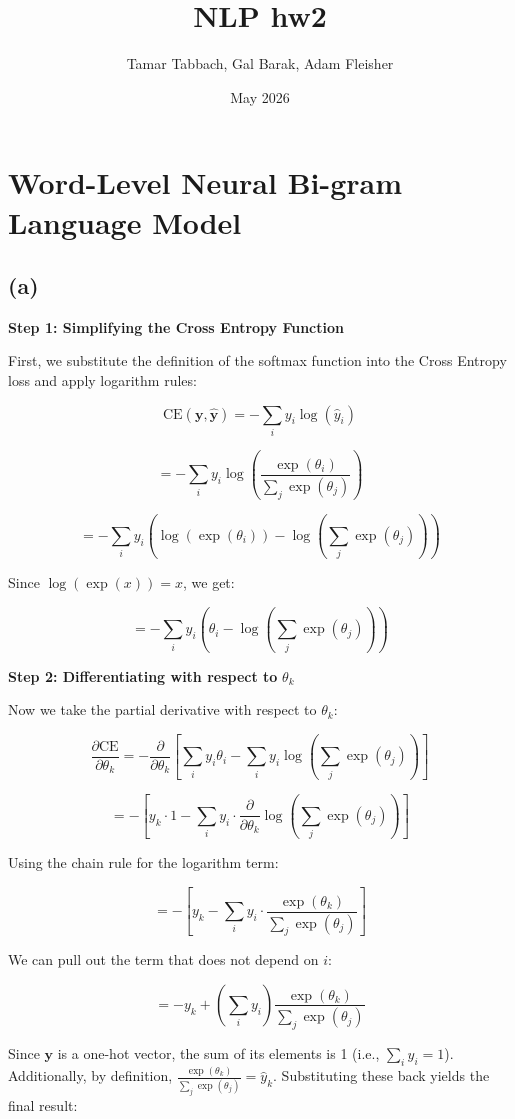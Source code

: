 \documentclass{article}
\title{NLP hw2}
\author{Tamar Tabbach, Gal Barak, Adam Fleisher}
\date{May 2026}
\begin{document}
\maketitle

\section{Word-Level Neural Bi-gram Language Model}

\subsection*{(a)}
\textbf{Step 1: Simplifying the Cross Entropy Function}

First, we substitute the definition of the softmax function into the Cross Entropy loss and apply logarithm rules:

$$\text{CE}(\mathbf{y}, \hat{\mathbf{y}}) = -\sum_i y_i \log(\hat{y}_i)$$

$$= -\sum_i y_i \log\left( \frac{\exp(\theta_i)}{\sum_j \exp(\theta_j)} \right)$$

$$= -\sum_i y_i \left( \log(\exp(\theta_i)) - \log\left(\sum_j \exp(\theta_j)\right) \right)$$

Since $\log(\exp(x)) = x$, we get:

$$= -\sum_i y_i \left( \theta_i - \log\left(\sum_j \exp(\theta_j)\right) \right)$$

\vspace{1em}
\textbf{Step 2: Differentiating with respect to } $\theta_k$

Now we take the partial derivative with respect to $\theta_k$:

$$\frac{\partial \text{CE}}{\partial \theta_k} = -\frac{\partial}{\partial \theta_k} \left[ \sum_i y_i \theta_i - \sum_i y_i \log\left(\sum_j \exp(\theta_j)\right) \right]$$

$$= -\left[ y_k \cdot 1 - \sum_i y_i \cdot \frac{\partial}{\partial \theta_k} \log\left(\sum_j \exp(\theta_j)\right) \right]$$

Using the chain rule for the logarithm term:

$$= -\left[ y_k - \sum_i y_i \cdot \frac{\exp(\theta_k)}{\sum_j \exp(\theta_j)} \right]$$

We can pull out the term that does not depend on $i$:

$$= -y_k + \left( \sum_i y_i \right) \frac{\exp(\theta_k)}{\sum_j \exp(\theta_j)}$$

Since $\mathbf{y}$ is a one-hot vector, the sum of its elements is 1 (i.e., $\sum_i y_i = 1$). Additionally, by definition, $\frac{\exp(\theta_k)}{\sum_j \exp(\theta_j)} = \hat{y}_k$. Substituting these back yields the final result:
\end{document}

